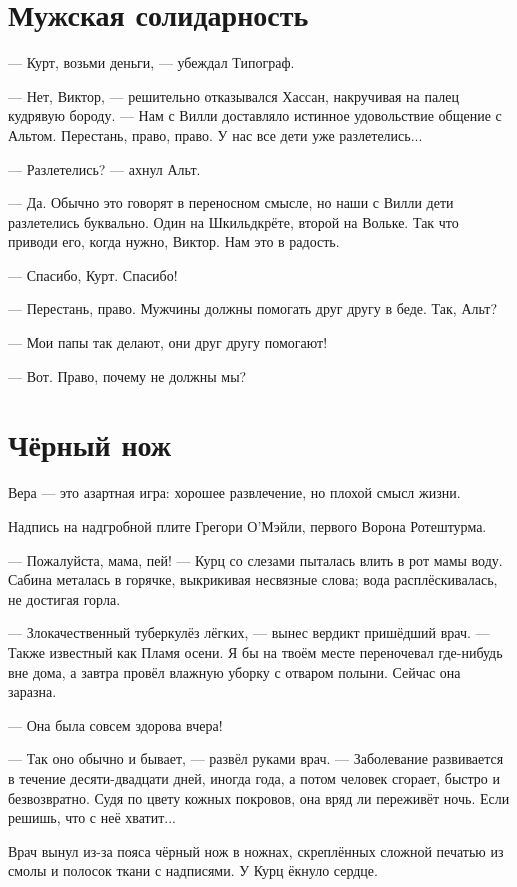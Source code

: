 \section{Мужская солидарность}

--- Курт, возьми деньги, --- убеждал Типограф.

--- Нет, Виктор, --- решительно отказывался Хассан, накручивая на палец кудрявую бороду.
--- Нам с Вилли доставляло истинное удовольствие общение с Альтом.
Перестань, право, право.
У нас все дети уже разлетелись...

--- Разлетелись? --- ахнул Альт.

--- Да.
Обычно это говорят в переносном смысле, но наши с Вилли дети разлетелись буквально.
Один на Шкильдкрёте, второй на Вольке.
Так что приводи его, когда нужно, Виктор.
Нам это в радость.

--- Спасибо, Курт.
Спасибо!

--- Перестань, право.
Мужчины должны помогать друг другу в беде.
Так, Альт?

--- Мои папы так делают, они друг другу помогают!

--- Вот.
Право, почему не должны мы?

\section{Чёрный нож}

\epigraph
{Вера --- это азартная игра: хорошее развлечение, но плохой смысл жизни.}
{Надпись на надгробной плите Грегори О'Мэйли, первого Ворона Ротештурма.}

--- Пожалуйста, мама, пей! --- Курц со слезами пыталась влить в рот мамы воду.
Сабина металась в горячке, выкрикивая несвязные слова;
вода расплёскивалась, не достигая горла.

--- Злокачественный туберкулёз лёгких, --- вынес вердикт пришёдший врач.
--- Также известный как Пламя осени.
Я бы на твоём месте переночевал где-нибудь вне дома, а завтра провёл влажную уборку с отваром полыни.
Сейчас она заразна.

--- Она была совсем здорова вчера!

--- Так оно обычно и бывает, --- развёл руками врач.
--- Заболевание развивается в течение десяти-двадцати дней, иногда года, а потом человек сгорает, быстро и безвозвратно.
Судя по цвету кожных покровов, она вряд ли переживёт ночь.
Если решишь, что с неё хватит...

Врач вынул из-за пояса чёрный нож в ножнах, скреплённых сложной печатью из смолы и полосок ткани с надписями.
У Курц ёкнуло сердце.

